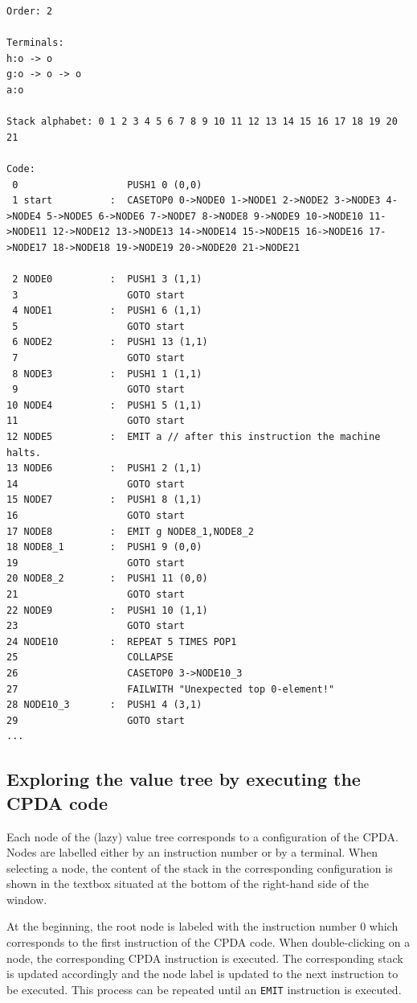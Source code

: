 \documentclass{article}
\begin{document}
\begin{lstlisting}[breaklines=true]
Order: 2

Terminals:
h:o -> o
g:o -> o -> o
a:o

Stack alphabet: 0 1 2 3 4 5 6 7 8 9 10 11 12 13 14 15 16 17 18 19 20 21

Code:
 0                   PUSH1 0 (0,0)
 1 start          :  CASETOP0 0->NODE0 1->NODE1 2->NODE2 3->NODE3 4->NODE4 5->NODE5 6->NODE6 7->NODE7 8->NODE8 9->NODE9 10->NODE10 11->NODE11 12->NODE12 13->NODE13 14->NODE14 15->NODE15 16->NODE16 17->NODE17 18->NODE18 19->NODE19 20->NODE20 21->NODE21

 2 NODE0          :  PUSH1 3 (1,1)
 3                   GOTO start
 4 NODE1          :  PUSH1 6 (1,1)
 5                   GOTO start
 6 NODE2          :  PUSH1 13 (1,1)
 7                   GOTO start
 8 NODE3          :  PUSH1 1 (1,1)
 9                   GOTO start
10 NODE4          :  PUSH1 5 (1,1)
11                   GOTO start
12 NODE5          :  EMIT a // after this instruction the machine halts.
13 NODE6          :  PUSH1 2 (1,1)
14                   GOTO start
15 NODE7          :  PUSH1 8 (1,1)
16                   GOTO start
17 NODE8          :  EMIT g NODE8_1,NODE8_2
18 NODE8_1        :  PUSH1 9 (0,0)
19                   GOTO start
20 NODE8_2        :  PUSH1 11 (0,0)
21                   GOTO start
22 NODE9          :  PUSH1 10 (1,1)
23                   GOTO start
24 NODE10         :  REPEAT 5 TIMES POP1
25                   COLLAPSE
26                   CASETOP0 3->NODE10_3
27                   FAILWITH "Unexpected top 0-element!"
28 NODE10_3       :  PUSH1 4 (3,1)
29                   GOTO start
...
\end{lstlisting}

\subsection{Exploring the value tree by executing the CPDA code}

Each node of the (lazy) value tree corresponds to a configuration of the CPDA.
Nodes are labelled either by an instruction number or by a terminal.
When selecting a node, the content of the stack in the corresponding configuration
is shown in the textbox situated at the bottom of the right-hand side of the window.

At the beginning, the root node is labeled with the instruction number $0$ which corresponds to the first
instruction of the CPDA code. When double-clicking on a node, the corresponding CPDA instruction is executed. The corresponding stack is updated accordingly and the node label is updated to the next instruction to be executed. This process can be repeated until an {\tt EMIT} instruction is executed.
\end{document}
